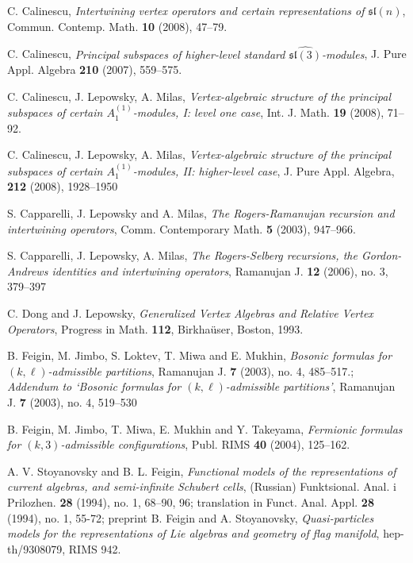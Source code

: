 \documentclass[a4paper, 10pt,oneside]{amsart}
\begin{document}
\begin{thebibliography}{DLinM}

 C. Calinescu, \textit{Intertwining vertex operators and certain representations of $\widehat{\mathfrak{sl}(n)}$}, Commun. Contemp. Math. {\bf 10} (2008), 47--79.

 C. Calinescu, \textit{Principal subspaces of higher-level standard $\widehat{\mathfrak{sl}(3)}$-modules}, J. Pure Appl. Algebra {\bf 210} (2007), 559--575.

 C. Calinescu, J. Lepowsky, A. Milas, \textit{Vertex-algebraic structure of the principal subspaces of certain $A_1^{(1)}$-modules, I: level one case}, Int. J. Math. {\bf 19} (2008), 71--92.

 C. Calinescu, J. Lepowsky, A. Milas, \textit{Vertex-algebraic structure of the principal subspaces of certain $A_1^{(1)}$-modules, II: higher-level case}, J. Pure Appl. Algebra, {\bf 212} (2008), 1928--1950

    S. Capparelli, J. Lepowsky and A. Milas,
\textit{The Rogers-Ramanujan recursion and intertwining operators},
Comm. Contemporary Math. {\bf 5} (2003), 947--966.

    S. Capparelli, J. Lepowsky, A. Milas,
\textit{The Rogers-Selberg recursions, the Gordon-Andrews identities and intertwining operators},  Ramanujan J.  {\bf 12}  (2006),  no. 3, 379--397

C. Dong and J. Lepowsky,
\textit{Generalized Vertex Algebras and Relative
Vertex Operators}, Progress in Math. {\bf 112}, Birkha\"user,
Boston, 1993.

 B. Feigin, M. Jimbo, S. Loktev, T. Miwa and E. Mukhin, \textit{Bosonic formulas for $(k,\ell)$-admissible partitions},  Ramanujan J. {\bf 7}  (2003),  no. 4, 485--517.; \textit{Addendum to `Bosonic formulas for $(k,\ell)$-admissible partitions'},  Ramanujan J. {\bf 7}  (2003),  no. 4, 519--530

 B. Feigin, M. Jimbo, T. Miwa, E. Mukhin and Y. Takeyama, \textit{Fermionic formulas for $(k,3)$-admissible configurations}, Publ. RIMS {\bf 40} (2004), 125--162.

 A. V. Stoyanovsky and B. L. Feigin, \textit{Functional models of the representations of current algebras, and semi-infinite Schubert cells}, (Russian) Funktsional. Anal. i Prilozhen. {\bf 28} (1994), no. 1, 68--90, 96; translation in Funct. Anal. Appl. {\bf 28} (1994), no. 1, 55-72; preprint B. Feigin and A. Stoyanovsky, \textit{Quasi-particles models for the representations of Lie algebras and geometry of flag manifold}, hep-th/9308079, RIMS 942.


\end{thebibliography}
\end{document}
